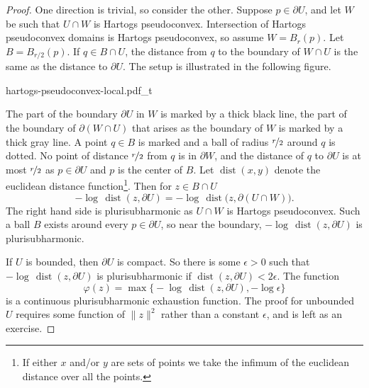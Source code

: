 \documentclass[12pt,openany]{book}
\newcommand{\snorm}[1]{\lVert {#1} \rVert}
\theoremstyle{plain}
\theoremstyle{remark}
\theoremstyle{definition}
\newenvironment{myfig}{%
    \begin{center}
}{%
    \end{center}
}
\theoremstyle{exercise}
\theoremstyle{example}
\begin{document}
\begin{proof}
One direction is trivial, so consider the other.
Suppose $p \in \partial U$, and let
$W$ be such that $U \cap W$
is Hartogs pseudoconvex.  Intersection of
Hartogs pseudoconvex domains is Hartogs pseudoconvex, so
assume $W = B_r(p)$.
Let $B = B_{r/2}(p)$.  If $q \in B \cap U$, the distance from $q$ to the boundary of $W \cap U$ is the same as
the distance to $\partial U$.  The setup is illustrated in the following
figure.

\begin{myfig}
{hartogs-pseudoconvex-local.pdf_t}
\end{myfig}

The part of the boundary $\partial U$ in $W$ is marked by a thick
black line, the part of the boundary of $\partial (W \cap U)$ that arises as
the boundary of $W$ is marked by a thick gray line.  A point $q \in B$ is
marked and a ball of radius $\nicefrac{r}{2}$ around $q$ is dotted.
No point of distance $\nicefrac{r}{2}$ from $q$ is in $\partial W$, and 
the distance of $q$ to $\partial U$ is at most $\nicefrac{r}{2}$ as $p \in \partial U$
and $p$ is the center of $B$.
%
Let $\operatorname{dist}(x,y)$ denote the
euclidean distance function\footnote{If either $x$ and/or $y$ are sets
of points we take the infimum of the euclidean distance over all the points.}.
Then for $z \in B \cap U$
\begin{equation*}
- \log \, \operatorname{dist}(z, \partial U) = 
- \log \, \operatorname{dist}\bigl(z, \partial (U \cap W)\bigr).
\end{equation*}
The right hand side is plurisubharmonic as $U \cap W$ is Hartogs
pseudoconvex.  Such a ball $B$ exists around every $p \in \partial U$, so near
the boundary, $- \log \, \operatorname{dist}(z, \partial U)$ is
plurisubharmonic.

If $U$ is bounded, then $\partial U$ is compact.  So there is some
$\epsilon > 0$ such that $- \log \, \operatorname{dist}(z, \partial U)$
is plurisubharmonic if $\operatorname{dist}(z, \partial U) < 2\epsilon$.
The function
\begin{equation*}
\varphi(z) = \max \bigl\{
- \log \, \operatorname{dist}(z, \partial U) , - \log \epsilon \bigr\} 
\end{equation*}
is a continuous plurisubharmonic exhaustion function.  The proof for
unbounded $U$ requires some function of $\snorm{z}^2$ rather than a constant
$\epsilon$,
and is left as an exercise.
\end{proof}
\end{document}
